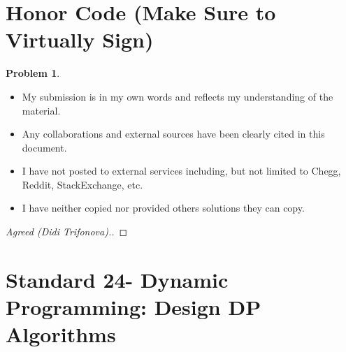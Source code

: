 \documentclass[11pt]{article}
\theoremstyle{definition}
\theoremstyle{definition}
\newtheorem{required}{Problem}
\theoremstyle{definition}
\begin{document}
\section{Honor Code (Make Sure to Virtually Sign)} \label{HonorCode}

\begin{required}
\begin{itemize}
\item My submission is in my own words and reflects my understanding of the material.
\item Any collaborations and external sources have been clearly cited in this document.
\item I have not posted to external services including, but not limited to Chegg, Reddit, StackExchange, etc.
\item I have neither copied nor provided others solutions they can copy.
\end{itemize}

\end{required}

\begin{proof}[Agreed (Didi Trifonova).]
\end{proof}


\newpage
\section{Standard 24- Dynamic Programming: Design DP Algorithms}
\end{document}
